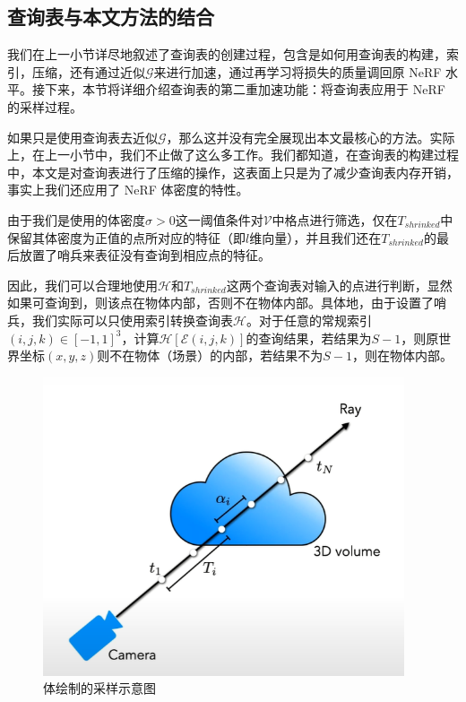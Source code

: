 \subsection{查询表与本文方法的结合}
我们在上一小节详尽地叙述了查询表的创建过程，包含是如何用查询表的构建，索引，压缩，还有通过近似$\mathcal{G}$来进行加速，通过再学习将损失的质量调回原 NeRF 水平。接下来，本节将详细介绍查询表的第二重加速功能：将查询表应用于 NeRF 的采样过程。

如果只是使用查询表去近似$\mathcal{G}$，那么这并没有完全展现出本文最核心的方法。实际上，在上一小节中，我们不止做了这么多工作。我们都知道，在查询表的构建过程中，本文是对查询表进行了压缩的操作，这表面上只是为了减少查询表内存开销，事实上我们还应用了 NeRF 体密度的特性。

由于我们是使用的体密度$\sigma > 0$这一阈值条件对$\mathcal{V}$中格点进行筛选，仅在$T_{shrinked}$中保留其体密度为正值的点所对应的特征（即$l$维向量），并且我们还在$T_{shrinked}$的最后放置了哨兵来表征没有查询到相应点的特征。

因此，我们可以合理地使用$\mathcal{H}$和$T_{shrinked}$这两个查询表对输入的点进行判断，显然如果可查询到，则该点在物体内部，否则不在物体内部。具体地，由于设置了哨兵，我们实际可以只使用索引转换查询表$\mathcal{H}$。对于任意的常规索引$\left(i, j, k\right) \in \left[-1, 1\right]^3$，计算$\mathcal{H}\left[\mathcal{E}\left(i, j, k\right)\right]$的查询结果，若结果为$S - 1$，则原世界坐标$\left(x, y, z\right)$则不在物体（场景）的内部，若结果不为$S - 1$，则在物体内部。

\begin{figure}[t]
    \centering
    \includegraphics[width=0.95\textwidth]{figures/cloud.jpg}
    \caption{体绘制的采样示意图}
    \label{fig:cloud}
\end{figure}

